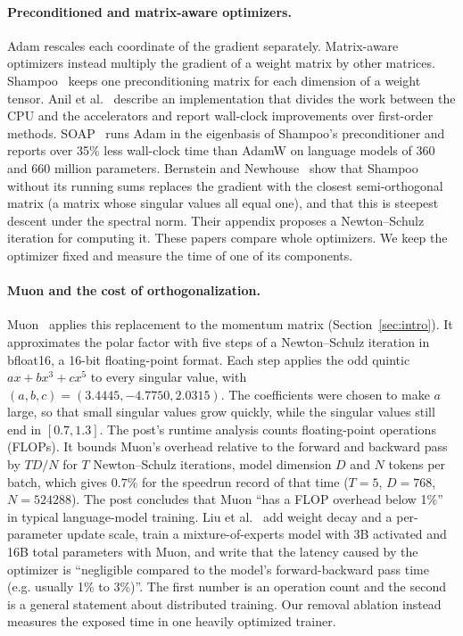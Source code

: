 \documentclass{article}
\begin{document}
\paragraph{Preconditioned and matrix-aware optimizers.} Adam rescales each coordinate of the gradient separately. Matrix-aware optimizers instead multiply the gradient of a weight matrix by other matrices. Shampoo~\cite{shampoo} keeps one preconditioning matrix for each dimension of a weight tensor. Anil et al.~\cite{anil} describe an implementation that divides the work between the CPU and the accelerators and report wall-clock improvements over first-order methods. SOAP~\cite{soap} runs Adam in the eigenbasis of Shampoo's preconditioner and reports over 35\% less wall-clock time than AdamW on language models of 360 and 660 million parameters. Bernstein and Newhouse~\cite{oonn} show that Shampoo without its running sums replaces the gradient with the closest semi-orthogonal matrix (a matrix whose singular values all equal one), and that this is steepest descent under the spectral norm. Their appendix proposes a Newton--Schulz iteration for computing it. These papers compare whole optimizers. We keep the optimizer fixed and measure the time of one of its components.

\paragraph{Muon and the cost of orthogonalization.} Muon~\cite{muonblog} applies this replacement to the momentum matrix (Section~\ref{sec:intro}). It approximates the polar factor with five steps of a Newton--Schulz iteration in bfloat16, a 16-bit floating-point format. Each step applies the odd quintic $ax+bx^3+cx^5$ to every singular value, with $(a,b,c)=(3.4445,-4.7750,2.0315)$. The coefficients were chosen to make $a$ large, so that small singular values grow quickly, while the singular values still end in $[0.7,1.3]$. The post's runtime analysis counts floating-point operations (FLOPs). It bounds Muon's overhead relative to the forward and backward pass by $TD/N$ for $T$ Newton--Schulz iterations, model dimension $D$ and $N$ tokens per batch, which gives $0.7\%$ for the speedrun record of that time ($T=5$, $D=768$, $N=524288$). The post concludes that Muon ``has a FLOP overhead below 1\%'' in typical language-model training. Liu et al.~\cite{muon} add weight decay and a per-parameter update scale, train a mixture-of-experts model with 3B activated and 16B total parameters with Muon, and write that the latency caused by the optimizer is ``negligible compared to the model's forward-backward pass time (e.g. usually 1\% to 3\%)''. The first number is an operation count and the second is a general statement about distributed training. Our removal ablation instead measures the exposed time in one heavily optimized trainer.
\end{document}
